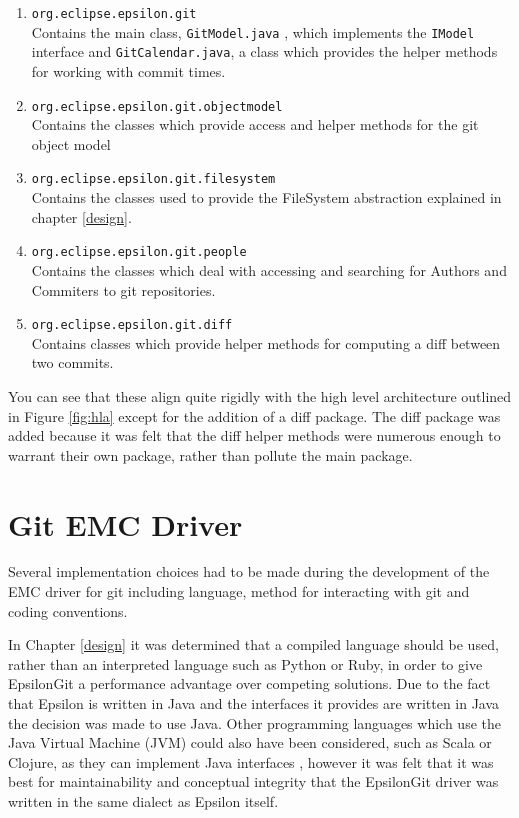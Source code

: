 \documentclass[11pt]{book}
\newcommand{\code}[1]{\texttt{#1}}
\begin{document}
\begin{enumerate}
	\item \code{org.eclipse.epsilon.git} \\ Contains the main class, \code{GitModel.java} , which implements the \code{IModel} interface and \code{GitCalendar.java}, a class which provides the helper methods for working with commit times.
	\item \code{org.eclipse.epsilon.git.objectmodel} \\ Contains the classes which provide access and helper methods for the git object model
	\item \code{org.eclipse.epsilon.git.filesystem} \\ Contains the classes used to provide the FileSystem abstraction explained in chapter \ref{design}.
	\item \code{org.eclipse.epsilon.git.people} \\ Contains the classes which deal with accessing and searching for Authors and Commiters to git repositories.
	\item \code{org.eclipse.epsilon.git.diff} \\ Contains classes which provide helper methods for computing a diff between two commits.
\end{enumerate}

You can see that these align quite rigidly with the high level architecture outlined in Figure \ref{fig:hla} except for the addition of a diff package. The diff package was added because it was felt that the diff helper methods were numerous enough to warrant their own package, rather than pollute the main package.

\section{Git EMC Driver}
Several implementation choices had to be made during the development of the EMC driver for git including language, method for interacting with git and coding conventions. 

In Chapter \ref{design} it was determined that a compiled language should be used, rather than an interpreted language such as Python or Ruby, in order to give EpsilonGit a performance advantage over competing solutions. Due to the fact that Epsilon is written in Java and the interfaces it provides are written in Java the decision was made to use Java. Other programming languages which use the Java Virtual Machine (JVM) could also have been considered, such as Scala or Clojure, as they can implement Java interfaces \cite{scalacookbook}, however it was felt that it was best for maintainability and conceptual integrity that the EpsilonGit driver was written in the same dialect as Epsilon itself.
\end{document}
